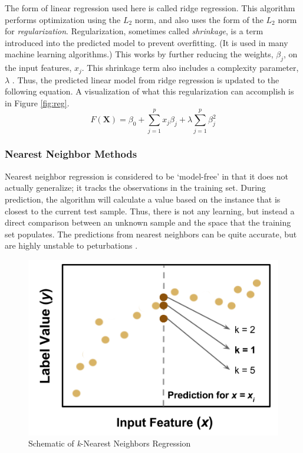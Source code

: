 The form of linear regression used here is called ridge regression. This
algorithm performs optimization using the $L_2$ norm, and also uses the form of
the $L_2$ norm for \textit{regularization}. Regularization, sometimes called
\textit{shrinkage}, is a term introduced into the predicted model to prevent
overfitting. (It is used in many machine learning algorithms.) This works by
further reducing the weights, $\beta_j$, on the input features, $x_j$. This
shrinkage term also includes a complexity parameter, $\lambda$
\cite{elements_stats}.  Thus, the predicted linear model from ridge regression
is updated to the following equation.  A visualization of what this
regularization can accomplish is in Figure \ref{fig:reg}.
\begin{equation}
  F(\boldsymbol{X}) = \beta_{0} +  \sum_{j=1}^{p} x_{j} \beta_{j} + \lambda \sum_{j=1}^{p} \beta_{j}^2
\end{equation}

\subsubsection{Nearest Neighbor Methods}
\label{sec:neighbor}

Nearest neighbor regression is considered to be `model-free' in that it does
not actually generalize; it tracks the observations in the training set.
During prediction, the algorithm will calculate a value based on the instance
that is closest to the current test sample. Thus, there is not any learning,
but instead a direct comparison between an unknown sample and the space that
the training set populates. The predictions from nearest neighbors can be quite
accurate, but are highly unstable to peturbations \cite{elements_stats}.  

\begin{figure}[!htb]
  \centering
  \includegraphics[width=0.8\linewidth]{./chapters/litrev/nn-fig.png}
  \caption{Schematic of \textit{k}-Nearest Neighbors Regression}
  \label{fig:nn}
\end{figure}

